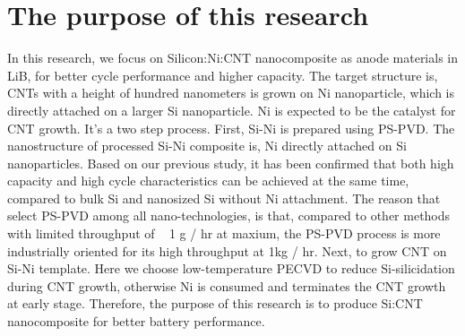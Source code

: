 \section{The purpose of this research}
In this research, we focus on Silicon:Ni:CNT nanocomposite as anode materials in LiB, for better cycle performance and higher capacity. The target structure is, CNTs with a height of hundred nanometers is grown on Ni nanoparticle, which is directly attached on a larger Si nanoparticle. Ni is expected to be the catalyst for CNT growth.
It's a two step process. First, Si-Ni is prepared using PS-PVD. The nanostructure of processed Si-Ni composite is, Ni directly attached on Si nanoparticles. Based on our previous study, it has been confirmed that both high capacity and high cycle characteristics can be achieved at the same time, compared to bulk Si and nanosized Si without Ni attachment. The reason that select PS-PVD among all nano-technologies, is that, compared to other methods with limited throughput of ~ 1 g / hr at maxium, the PS-PVD process is more industrially oriented for its high throughput at 1kg / hr.
Next, to grow CNT on Si-Ni template. Here we choose low-temperature PECVD to reduce Si-silicidation during CNT growth, otherwise Ni is consumed and terminates the CNT growth at early stage.
Therefore, the purpose of this research is to produce Si:CNT nanocomposite for better battery performance.
